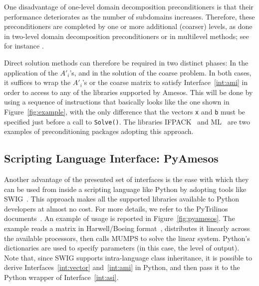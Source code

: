 \documentclass[acmtoms,acmnow]{acmtrans2m}
\newcommand{\amesos}{{\sc Amesos}}
\begin{document}
One disadvantage of one-level domain decomposition preconditioners
is that their performance deteriorates as the number of subdomains
increases. Therefore, these preconditioners are completed by one or
more additional (coarser) levels, as done in two-level domain
decomposition preconditioners or in multilevel methods; see for
instance \cite{brandt.classic,hack.book}.

Direct solution methods can therefore be required in two distinct phases: In the application of
the $A'_i$'s, and in the solution of the coarse problem. In both cases, it
suffices to wrap the $A'_i$'s or the coarse matrix to satisfy
Interface~\ref{int:ami} in order to access to any of the libraries
supported by \amesos. This will be done by using a sequence of instructions that basically looks
like the one shown in Figure~\ref{fig:example}, with the only difference that
the vectors \verb!x! and \verb!b! must be specified just before a call to
\verb!Solve()!.  The libraries IFPACK~\cite{ifpack-guide} and
ML~\cite{ml-guide} are two examples of preconditioning packages adopting this
approach.

\subsection{Scripting Language Interface: PyAmesos}
\label{sec:pyamesos}

Another advantage of the presented set of interfaces is the ease with which
they can be used from inside a scripting language like Python by adopting
tools like SWIG~\cite{swig}. This approach makes all the supported libraries
available to Python developers at almost no cost. For more details, we refer
to the PyTrilinos documents~\cite{sala05pytrilinos,pytrilinos-la-guide}.  An
example of usage is reported in Figure~\ref{fig:pyamesos}. The example reads a
matrix in Harwell/Boeing format~\cite{duff89sparse}, distributes it linearly
across the available processors, then calls MUMPS to solve the linear system.
Python's dictionaries are used to specify parameters (in this case, the level
                                                      of output). Note that,
  since SWIG supports intra-language class inheritance, it is possible to
  derive Interfaces~\ref{int:vector} and~\ref{int:ami} in Python, and then pass it to the Python
  wrapper of Interface~\ref{int:asi}.
\end{document}
